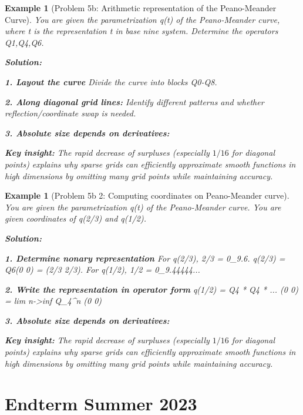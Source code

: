 \documentclass[11pt,a4paper]{article}
\newtheorem{example}[theorem]{Example}
\begin{document}
\begin{example}[Problem 5b: Arithmetic representation of the Peano-Meander Curve]
    You are given the parametrization q(t) of the Peano-Meander curve, where t is the representation t in base nine system. Determine the operators Q1,Q4,Q6.
   
   \textbf{Solution:}
   
   \textbf{1. Layout the curve} Divide the curve into blocks Q0-Q8. 
   
   \textbf{2. Along diagonal grid lines:} Identify different patterns and whether reflection/coordinate swap is needed.
   
   \textbf{3. Absolute size depends on derivatives:}

   
   \textbf{Key insight:} The rapid decrease of surpluses (especially $1/16$ for diagonal points) explains why sparse grids can efficiently approximate smooth functions in high dimensions by omitting many grid points while maintaining accuracy.
\end{example}

\begin{example}[Problem 5b 2: Computing coordinates on Peano-Meander curve]
    You are given the parametrization q(t) of the Peano-Meander curve. You are given coordinates of q(2/3) and q(1/2).
   
   \textbf{Solution:}
   
   \textbf{1. Determine nonary representation} For q(2/3), 2/3 = 0_9.6. q(2/3) = Q6(0 0) = (2/3 2/3). For q(1/2), 1/2 = 0_9.44444...
   
   \textbf{2. Write the representation in operator form} q(1/2) = Q4 * Q4 * ... (0 0) = lim n->inf Q_4^n (0 0)
   
   \textbf{3. Absolute size depends on derivatives:}

   
   \textbf{Key insight:} The rapid decrease of surpluses (especially $1/16$ for diagonal points) explains why sparse grids can efficiently approximate smooth functions in high dimensions by omitting many grid points while maintaining accuracy.
\end{example}

\section{Endterm Summer 2023}
\end{document}
